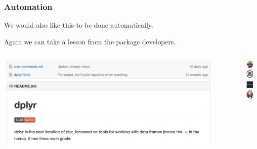 \documentclass[12pt]{beamer}
\begin{document}
\begin{frame}
\frametitle{Automation}

\vspace{-5mm}

We would also like this to be done automatically.

\vspace{3mm}\pause

Again we can take a lesson from the package developers.

\vspace{3mm}

\begin{columns}
\begin{center}
\includegraphics[width=0.9\textwidth]{imgs/dplyr_CI.png}
\end{center}


\begin{center}
\includegraphics[width=0.3in]{imgs/travis.png}\\
\includegraphics[width=0.3in]{imgs/wercker.png}\\
\includegraphics[width=0.3in]{imgs/drone.png}\\
\includegraphics[width=0.3in]{imgs/jenkins.png}
\end{center}
\end{columns}

\end{frame}
\end{document}
